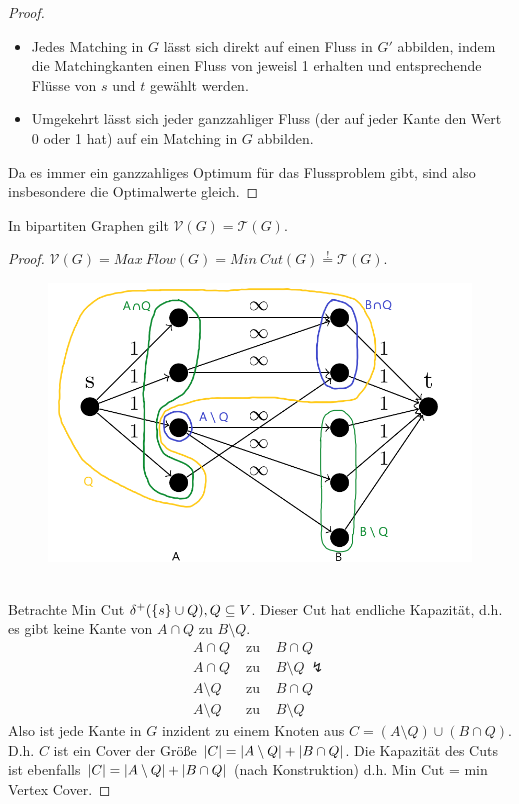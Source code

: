\begin{proof}~
	\begin{itemize}
		\item Jedes Matching in $G$ lässt sich direkt auf einen Fluss in $G'$ abbilden, indem die Matchingkanten einen Fluss von jeweisl 1 erhalten und entsprechende Flüsse von $s$ und $t$ gewählt werden.
		\item Umgekehrt lässt sich jeder ganzzahliger Fluss (der auf jeder Kante den Wert 0 oder 1 hat) auf ein Matching in $G$ abbilden.
	\end{itemize}
	Da es immer ein ganzzahliges Optimum für das Flussproblem gibt, sind also insbesondere die Optimalwerte gleich.
\end{proof}
\begin{satz}
	In bipartiten Graphen gilt $\mathcal{V}(G) = \mathcal{T}(G)$.
\end{satz}
\begin{proof}
	$\mathcal{V}(G) = Max~Flow(G) = Min~Cut(G) \overset{!}{=} \mathcal{T}(G)$. 
		\begin{figure}[ht]
			\begin{center}
				\includegraphics[scale=.3]{satz_5_8.png}
			\end{center}
		\end{figure}\\
	Betrachte Min Cut $\delta^+(\{s\}\cup Q), Q \subseteq V$. Dieser Cut hat endliche Kapazität, d.h. es gibt keine Kante von $A \cap Q$ zu $B\setminus Q$.
	\begin{eqnarray*}
		A \cap Q & \text{ zu } & B \cap Q\\
		A \cap Q & \text{ zu } & B \setminus Q ~\lightning\\
		A \setminus Q & \text{ zu } & B \cap Q\\
		A \setminus Q & \text{ zu } & B \setminus Q
	\end{eqnarray*}
	Also ist jede Kante in $G$ inzident zu einem Knoten aus $C = (A\setminus Q)\cup (B \cap Q)$. D.h. $C$ ist ein Cover der Größe $\vert C \vert = \vert A\setminus Q \vert + \vert B\cap Q \vert$. Die Kapazität des Cuts ist ebenfalls $\vert C \vert = \vert A\setminus Q \vert + \vert B\cap Q \vert$ (nach Konstruktion) d.h. Min Cut = min Vertex Cover.
\end{proof}
